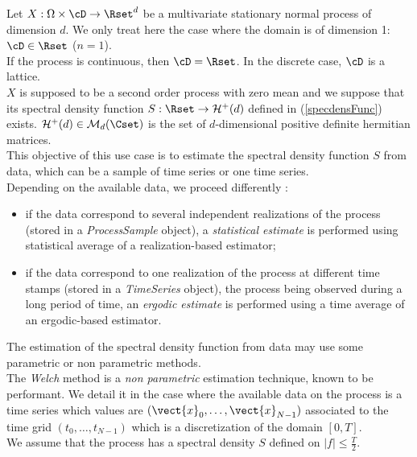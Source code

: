 \renewcommand{\filename}{docUC_StocProc_DensitySpectralModel_Estimation.tex}
\renewcommand{\filetitle}{UC : Estimation of a spectral density function}

\HeaderIIILevel


Let $X: \Omega \times \cD \rightarrow \Rset^d$  be a multivariate  stationary normal process of dimension $d$. We only treat here the case where the domain is of dimension 1: $\cD \in \Rset$ ($n=1$). \\
If the process is continuous, then $\cD=\Rset$. In the discrete case, $\cD$  is a lattice. \\


$X$ is supposed to be a second order process with zero mean and we suppose that its spectral density function $S : \Rset \rightarrow \mathcal{H}^+(d)$ defined in (\ref{specdensFunc}) exists. $\mathcal{H}^+(d) \in \mathcal{M}_d(\Cset)$ is the set of $d$-dimensional positive definite hermitian matrices.\\


This objective of this use case is to estimate the spectral density function $S$ from data, which can be a sample of time series or one time series.\\
Depending on the available data, we proceed differently :
\begin{itemize}
\item if the data correspond to  several independent  realizations of the  process (stored in a \textit{ProcessSample} object), a \emph{statistical estimate} is performed using statistical average of a realization-based estimator;
\item if the data correspond to one realization of the  process  at different time stamps (stored in a  \textit{TimeSeries} object), the process being observed during a long period of time, an \emph{ergodic estimate} is performed using a time average of an ergodic-based estimator.
\end{itemize}

The estimation of the spectral density function from data may use some parametric or non parametric methods. \\
The \textit{Welch} method is a \emph{non parametric} estimation technique, known to be performant. We detail it in the case where the available data on the process is a time series which values are $(\vect{x}_0, \dots,\vect{x}_{N-1})$ associated to the time grid $(t_0, \dots, t_{N-1})$ which is a discretization of the domain $[0,T]$.\\
We assume that the process has a spectral density $S$ defined on $| f | \leq \frac{T}{2}$.\\

